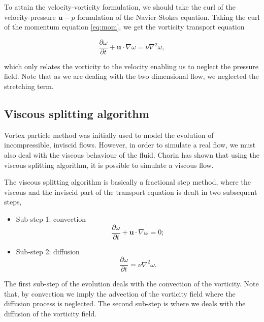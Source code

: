 To attain the velocity-vorticity formulation, we should take the curl of the velocity-pressure $\mathbf{u}-p$ formulation of the Navier-Stokes equation. Taking the curl of the momentum equation \ref{eq:mom}, we get the vorticity transport equation

	\begin{equation}
	\frac{\partial \omega}{\partial t} + \mathbf{u}\cdot\nabla\omega = \nu \nabla^2 \omega,
	\end{equation}

which only relates the vorticity to the velocity enabling us to neglect the pressure field. Note that as we are dealing with the two dimensional flow, we neglected the stretching term. 


\subsection{Viscous splitting algorithm}
Vortex particle method was initially used to model the evolution of incompressible, inviscid flows. However, in order to simulate a real flow, we must also deal with the viscous behaviour of the fluid. Chorin \cite{Chorin1973} has shown that using the viscous splitting algorithm, it is possible to simulate a viscous flow. 

The viscous splitting algorithm is basically a fractional step method, where the viscous and the inviscid part of the transport equation is dealt in two subsequent steps, 

	\begin{itemize}
	\item Sub-step 1: convection
		\begin{equation}
		\frac{\partial\omega}{\partial t} + \mathbf{u}\cdot\nabla\omega=0;
		\label{eq:convectionEulerian}
		\end{equation}
		
	\item Sub-step 2: diffusion
		\begin{equation}
		\frac{\partial\omega}{\partial t} = \nu\nabla^2\omega.
		\end{equation}
	
	\end{itemize}

The first sub-step of the evolution deals with the convection of the vorticity. Note that, by convection we imply the advection of the vorticity field where the diffusion process is neglected. The second sub-step is where we deals with the diffusion of the vorticity field. 

